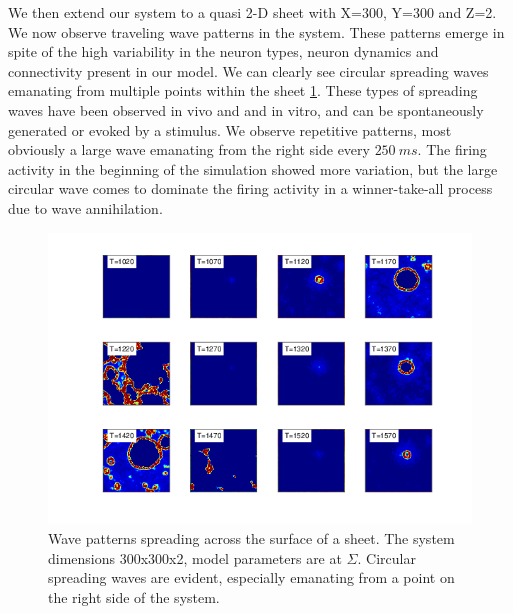 \documentclass[12pt]{article}
\begin{document}
We then extend our system to a quasi 2-D sheet with X=300, Y=300 and Z=2.
We now observe traveling wave patterns in the system.
These patterns emerge in spite of the high variability in the neuron types, neuron dynamics and connectivity present in our model.
We can clearly see  circular spreading waves emanating from multiple points within the sheet \ref{fig:2D_waves}.
These types of spreading waves have been observed in vivo\parencite{Mohajerani2013} and and in vitro, and can be spontaneously generated or evoked by a stimulus\parencite{Stroh2013}.
We observe repetitive patterns, most obviously a large wave emanating from the right side every $250~ms$.
The firing activity in the beginning of the simulation showed more variation, but the large circular wave comes to dominate the firing activity 
in a winner-take-all process due to wave annihilation.
\begin{figure}[!htb]
 \caption{ Wave patterns spreading across the surface of a sheet. 
           The system dimensions 300x300x2, model parameters are at $\Sigma$. 
           Circular spreading waves are evident, especially emanating from a point on the right side of the system.}
 \label{fig:2D_waves}
 \centering
   \includegraphics[width=\textwidth]{fig/2DSpreadingWaves_Sigma}
\end{figure}

\FloatBarrier
\end{document}
